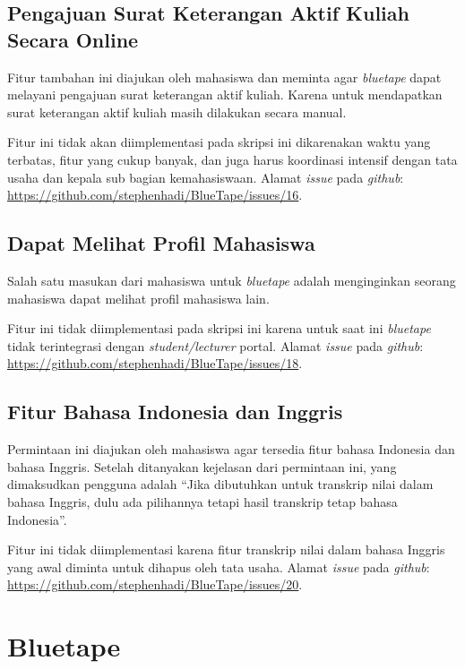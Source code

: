\subsection{Pengajuan Surat Keterangan Aktif Kuliah Secara Online}
\label{issue:16}
Fitur tambahan ini diajukan oleh mahasiswa dan meminta agar \textit{bluetape} dapat melayani pengajuan surat keterangan aktif kuliah. Karena untuk mendapatkan surat keterangan aktif kuliah masih dilakukan secara manual.

Fitur ini tidak akan diimplementasi pada skripsi ini dikarenakan waktu yang terbatas, fitur yang cukup banyak, dan juga harus koordinasi intensif dengan tata usaha dan kepala sub bagian kemahasiswaan. Alamat \textit{issue} pada \textit{github}: \url{https://github.com/stephenhadi/BlueTape/issues/16}.
 

\subsection{Dapat Melihat Profil Mahasiswa}

\label{issue:18}
Salah satu masukan dari mahasiswa untuk \textit{bluetape} adalah menginginkan seorang mahasiswa dapat melihat profil mahasiswa lain.

Fitur ini tidak diimplementasi pada skripsi ini karena untuk saat ini \textit{bluetape} tidak terintegrasi dengan \textit{student/lecturer} portal. Alamat \textit{issue} pada \textit{github}: \url{https://github.com/stephenhadi/BlueTape/issues/18}. 


\subsection{Fitur Bahasa Indonesia dan Inggris}
\label{issue:20}
Permintaan ini diajukan oleh mahasiswa agar tersedia fitur bahasa Indonesia dan bahasa Inggris. Setelah ditanyakan kejelasan dari permintaan ini, yang dimaksudkan pengguna adalah ``Jika dibutuhkan untuk transkrip nilai dalam bahasa Inggris, dulu ada pilihannya tetapi hasil transkrip tetap bahasa Indonesia''.

Fitur ini tidak diimplementasi karena fitur transkrip nilai dalam bahasa Inggris yang awal diminta untuk dihapus oleh tata usaha. Alamat \textit{issue} pada \textit{github}: \url{https://github.com/stephenhadi/BlueTape/issues/20}. 

\section{Bluetape}

